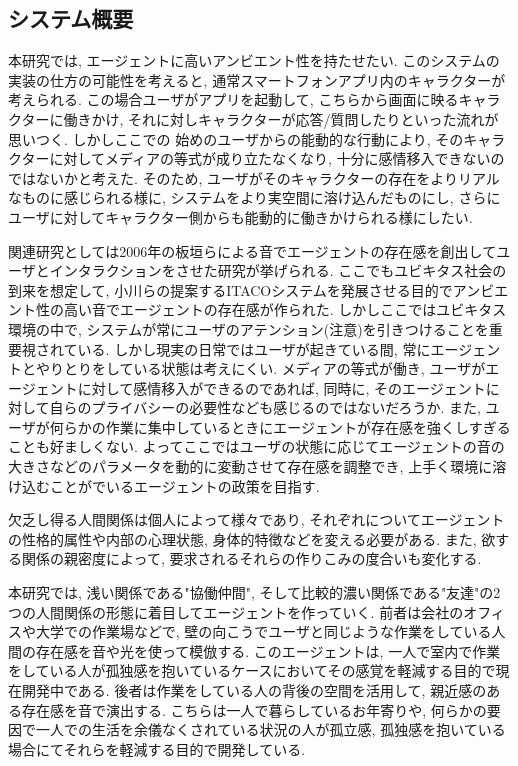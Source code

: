\documentclass[a4paper,dvipdfmx]{hisken}
\begin{document}
\subsection{システム概要}
本研究では, エージェントに高いアンビエント性を持たせたい. このシステムの実装の仕方の可能性を考えると, 通常スマートフォンアプリ内のキャラクターが考えられる. この場合ユーザがアプリを起動して, こちらから画面に映るキャラクターに働きかけ, それに対しキャラクターが応答/質問したりといった流れが思いつく. しかしここでの 始めのユーザからの能動的な行動により, そのキャラクターに対してメディアの等式が成り立たなくなり, 十分に感情移入できないのではないかと考えた. そのため, ユーザがそのキャラクターの存在をよりリアルなものに感じられる様に, システムをより実空間に溶け込んだものにし, さらにユーザに対してキャラクター側からも能動的に働きかけられる様にしたい.

関連研究としては2006年の板垣らによる音でエージェントの存在感を創出してユーザとインタラクションをさせた研究{}\cite{tex9}が挙げられる. ここでもユビキタス社会の到来を想定して, 小川らの提案するITACOシステムを発展させる目的でアンビエント性の高い音でエージェントの存在感が作られた. しかしここではユビキタス環境の中で, システムが常にユーザのアテンション(注意)を引きつけることを重要視されている. しかし現実の日常ではユーザが起きている間, 常にエージェントとやりとりをしている状態は考えにくい. メディアの等式が働き, ユーザがエージェントに対して感情移入ができるのであれば, 同時に, そのエージェントに対して自らのプライバシーの必要性なども感じるのではないだろうか. また, ユーザが何らかの作業に集中しているときにエージェントが存在感を強くしすぎることも好ましくない. よってここではユーザの状態に応じてエージェントの音の大きさなどのパラメータを動的に変動させて存在感を調整でき, 上手く環境に溶け込むことがでいるエージェントの政策を目指す.

欠乏し得る人間関係は個人によって様々であり, それぞれについてエージェントの性格的属性や内部の心理状態, 身体的特徴などを変える必要がある. また, 欲する関係の親密度によって, 要求されるそれらの作りこみの度合いも変化する. 

本研究では, 浅い関係である"協働仲間", そして比較的濃い関係である"友達"の2つの人間関係の形態に着目してエージェントを作っていく. 前者は会社のオフィスや大学での作業場などで, 壁の向こうでユーザと同じような作業をしている人間の存在感を音や光を使って模倣する. このエージェントは, 一人で室内で作業をしている人が孤独感を抱いているケースにおいてその感覚を軽減する目的で現在開発中である. 後者は作業をしている人の背後の空間を活用して, 親近感のある存在感を音で演出する. こちらは一人で暮らしているお年寄りや, 何らかの要因で一人での生活を余儀なくされている状況の人が孤立感, 孤独感を抱いている場合にてそれらを軽減する目的で開発している.
\end{document}
